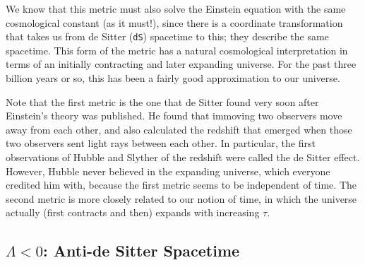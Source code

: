We know that this metric must also solve the Einstein equation with the same cosmological constant (as it must!), since there is a coordinate transformation that takes us from de Sitter (\texttt{dS}) spacetime to this; they describe the same spacetime.
This form of the metric has a natural cosmological interpretation in terms of an initially contracting and later expanding universe.
For the past three billion years or so, this has been a fairly good approximation to our universe.
\begin{leftbar}
  \begin{remark}
    Note that the first metric is the one that de Sitter found very soon after Einstein's theory was published.
    He found that immoving two observers move away from each other, and also calculated the redshift that emerged when those two observers sent light rays between each other.
    In particular, the first observations of Hubble and Slyther of the redshift were called the de Sitter effect.
    However, Hubble never believed in the expanding universe, which everyone credited him with, because the first metric seems to be independent of time.
    The second metric is more closely related to our notion of time, in which the universe actually (first contracts and then) expands with increasing $\tau$.
  \end{remark}
\end{leftbar}

\subsection{\texorpdfstring{$\Lambda < 0$}{Negative Cosmological Constant}: Anti-de Sitter Spacetime}%
\label{sub:anti_de_sitter_spacetime}

